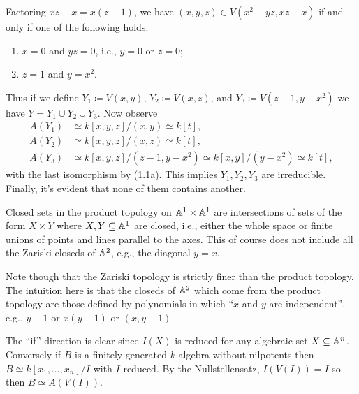 \begin{nothing}
  Factoring $xz-x = x(z-1)$, we have $(x,y,z) \in V(x^2-yz,xz-x)$ if
  and only if one of the following holds:
  \begin{enumerate}
  \item $x = 0$ and $yz = 0$, i.e., $y = 0$ or $z = 0$;
  \item $z = 1$ and $y = x^2$.
  \end{enumerate}
  Thus if we define $Y_1 \coloneqq V(x,y)$, $Y_2 \coloneqq V(x,z)$,
  and $Y_3 \coloneqq V(z-1,y-x^2)$ we have $Y = Y_1 \cup Y_2 \cup
  Y_3$. Now observe
  \begin{align*}
  A(Y_1) &\simeq k[x,y,z]/(x,y) \simeq k[t], \\
  A(Y_2) &\simeq k[x,y,z]/(x,z) \simeq k[t], \\
  A(Y_3) &\simeq k[x,y,z]/(z-1,y-x^2) \simeq k[x,y]/(y-x^2) \simeq
  k[t],
  \end{align*}
  with the last isomorphism by (1.1a). This implies $Y_1,Y_2,Y_3$ are
  irreducible. Finally, it's evident that none of them contains
  another.
\end{nothing}

\begin{nothing}
  Closed sets in the product topology on $\mathbb{A}^1 \times \mathbb{A}^1$ are
  intersections of sets of the form $X \times Y$ where $X,Y \subseteq
  \mathbb{A}^1$ are closed, i.e., either the whole space or finite unions of
  points and lines parallel to the axes. This of course does not
  include all the Zariski closeds of $\mathbb{A}^2$, e.g., the diagonal $y=x$.

  Note though that the Zariski topology is strictly finer than the
  product topology. The intuition here is that the closeds of $\mathbb{A}^2$
  which come from the product topology are those defined by
  polynomials in which ``$x$ and $y$ are independent'', e.g., $y-1$
  or $x(y-1)$ or $(x,y-1)$.
\end{nothing}

\begin{nothing}
  The ``if'' direction is clear since $I(X)$ is reduced for any
  algebraic set $X \subseteq \mathbb{A}^n$. Conversely if $B$ is a finitely
  generated $k$-algebra without nilpotents then $B \simeq
  k[x_1,\ldots,x_n]/I$ with $I$ reduced. By the Nullstellensatz,
  $I(V(I)) = I$ so then $B \simeq A(V(I))$.
\end{nothing}

